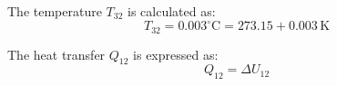 The temperature \( T_{32} \) is calculated as:  
\[
T_{32} = 0.003^\circ\text{C} = 273.15 + 0.003 \, \text{K}
\]

The heat transfer \( Q_{12} \) is expressed as:  
\[
Q_{12} = \Delta U_{12}
\]